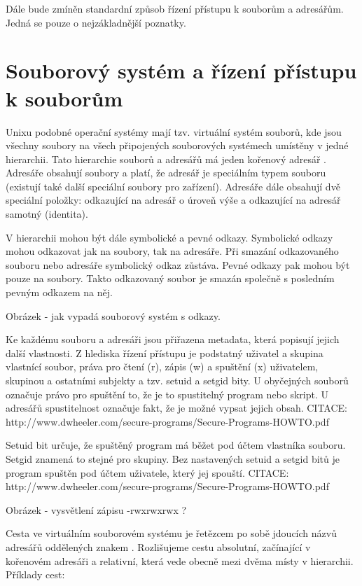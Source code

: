 Dále bude zmíněn standardní způsob řízení přístupu k souborům a adresářům. Jedná se pouze o nejzákladnější poznatky.


\section{Souborový systém a řízení přístupu k souborům}
Unixu podobné operační systémy mají tzv. virtuální systém souborů, kde jsou všechny soubory na všech připojených souborových systémech umístěny v jedné hierarchii. Tato hierarchie souborů a adresářů má jeden kořenový adresář \uv{/}. Adresáře obsahují soubory a platí, že adresář je speciálním typem souboru (existují také další speciální soubory pro zařízení). Adresáře dále obsahují dvě speciální položky:  odkazující na adresář o úroveň výše a  odkazující na adresář samotný (identita).

V hierarchii mohou být dále symbolické a pevné odkazy. Symbolické odkazy mohou odkazovat jak na soubory, tak na adresáře. Při smazání odkazovaného souboru nebo adresáře symbolický odkaz zůstáva. Pevné odkazy pak mohou být pouze na soubory. Takto odkazovaný soubor je smazán společně s posledním pevným odkazem na něj.

Obrázek - jak vypadá souborový systém s odkazy.

Ke každému souboru a adresáři jsou přiřazena metadata, která popisují jejich další vlastnosti. Z hlediska řízení přístupu je podstatný uživatel a skupina vlastnící soubor, práva pro čtení (r), zápis (w) a spuštění (x) uživatelem, skupinou a ostatními subjekty a tzv. setuid a setgid bity. U obyčejných souborů označuje právo pro spuštění to, že je to spustitelný program nebo skript. U adresářů spustitelnost označuje fakt, že je možné vypsat jejich obsah.
CITACE: http://www.dwheeler.com/secure-programs/Secure-Programs-HOWTO.pdf

Setuid bit určuje, že spuštěný program má běžet pod účtem vlastníka souboru. Setgid znamená to stejné pro skupiny. Bez nastavených setuid a setgid bitů je program spuštěn pod účtem uživatele, který jej spouští.
CITACE: http://www.dwheeler.com/secure-programs/Secure-Programs-HOWTO.pdf

Obrázek - vysvětlení zápisu -rwxrwxrwx ?

Cesta ve virtuálním souborovém systému je řetězcem po sobě jdoucích názvů adresářů oddělených znakem \uv{/}. Rozlišujeme cestu absolutní, začínající v kořenovém adresáři a relativní, která vede obecně mezi dvěma místy v hierarchii.
Příklady cest:

